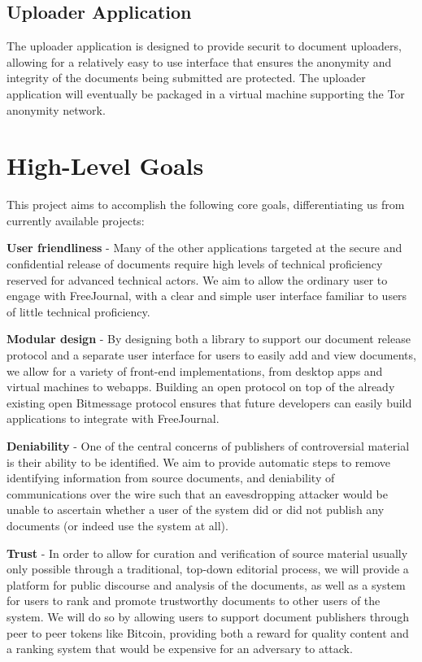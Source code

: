 \documentclass[letterpaper,10pt,oneside]{sphinxmanual}
\begin{document}
\subsection{Uploader Application}
\label{design:uploader-application}
The uploader application is designed to provide securit to document uploaders, allowing for a relatively easy to use interface
that ensures the anonymity and integrity of the documents being submitted are protected.  The uploader application will eventually
be packaged in a virtual machine supporting the Tor anonymity network.


\section{High-Level Goals}
\label{design:high-level-goals}
This project aims to accomplish the following core goals, differentiating us from currently available projects:

\textbf{User friendliness} - Many of the other applications targeted at the secure and confidential release of documents require high
levels of technical proficiency reserved for advanced technical actors.  We aim to allow the ordinary user to engage with
FreeJournal, with a clear and simple user interface familiar to users of little technical proficiency.

\textbf{Modular design} - By designing both a library to support our document release protocol and a separate user interface for
users to easily add and view documents, we allow for a variety of front-end implementations, from desktop apps and virtual
machines to webapps.  Building an open protocol on top of the already existing open Bitmessage protocol ensures that future
developers can easily build applications to integrate with FreeJournal.

\textbf{Deniability} - One of the central concerns of publishers of controversial material is their ability to be identified.  We aim
to provide automatic steps to remove identifying information from source documents, and deniability of communications over the
wire such that an eavesdropping attacker would be unable to ascertain whether a user of the system did or did not publish any
documents (or indeed use the system at all).

\textbf{Trust} - In order to allow for curation and verification of source material usually only possible through a traditional,
top-down editorial process, we will provide a platform for public discourse and analysis of the documents, as well as a system
for users to rank and promote trustworthy documents to other users of the system.  We will do so by allowing users to support
document publishers through peer to peer tokens like Bitcoin, providing both a reward for quality content and a ranking system
that would be expensive for an adversary to attack.
\end{document}

